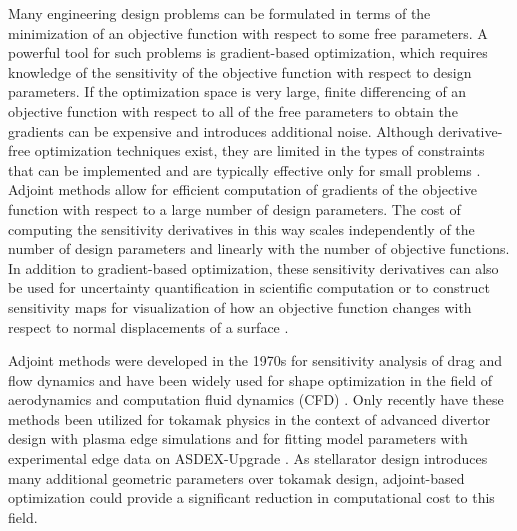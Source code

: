 \documentclass[aps,unsortedaddress]{revtex4-1}
\begin{document}


Many engineering design problems can be formulated in terms of the minimization of an objective function with respect to some free parameters. A powerful tool for such problems is gradient-based optimization, which requires knowledge of the sensitivity of the objective function with respect to design parameters. If the optimization space is very large, finite differencing of an objective function with respect to all of the free parameters to obtain the gradients can be expensive and introduces additional noise. Although derivative-free optimization techniques exist, they are limited in the types of constraints that can be implemented and are typically effective only for small problems \cite{Nocedal2006}. Adjoint methods allow for efficient computation of gradients of the objective function with respect to a large number of design parameters. The cost of computing the sensitivity derivatives in this way scales independently of the number of design parameters and linearly with the number of objective functions. In addition to gradient-based optimization, these sensitivity derivatives can also be used for uncertainty quantification in scientific computation \cite{Roy2011} or to construct sensitivity maps for visualization of how an objective function changes with respect to normal displacements of a surface \cite{Othmer2008,Othmer2014}. 

Adjoint methods were developed in the 1970s for sensitivity analysis of drag and flow dynamics \cite{Pironneau1974} and have been widely used for shape optimization in the field of aerodynamics and computation fluid dynamics (CFD) \cite{Kuruvila1995,Jameson1998,Anderson1999,Othmer2008,Othmer2014}. Only recently have these methods been utilized for tokamak physics in the context of advanced divertor design with plasma edge simulations \cite{Baelmans2017} and for fitting model parameters with experimental edge data on ASDEX-Upgrade \cite{Kim2001}. As stellarator design introduces many additional geometric parameters over tokamak design, adjoint-based optimization could provide a significant reduction in computational cost to this field. 

\end{document}
